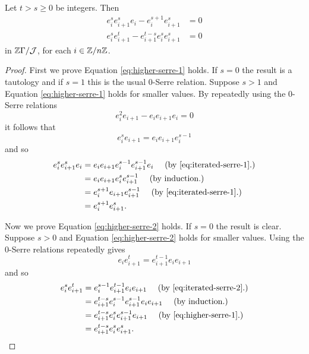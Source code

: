\documentclass[a4paper, 11pt, twoside]{report}
\begin{document}
\begin{lemma}\label{lemma:higher-Serre-relations-plus}
Let $t>s\geq 0$ be integers. Then
\begin{align}
e_i^s e_{i+1}^s e_i - e_i^{s+1}e_{i+1}^s &= 0 \label{eq:higher-serre-1}\\
e_i^s e_{i+1}^t - e_{i+1}^{t-s} e_i^s e_{i+1}^s &= 0 \label{eq:higher-serre-2}
\end{align}
in $\mathbb{Z}\Gamma/{\mathcal{J}}$, for each $i\in\mathbb{Z}/{n \mathbb{Z}}$.
\end{lemma}

\begin{proof}
First we prove Equation \eqref{eq:higher-serre-1} holds. If $s=0$ the result is a tautology and if $s=1$ this is the usual $0$-Serre relation. Suppose $s>1$ and Equation \eqref{eq:higher-serre-1} holds for smaller values. By repeatedly using the $0$-Serre relations
\begin{equation*}
e_i^2e_{i+1} - e_ie_{i+1}e_i = 0
\end{equation*}
it follows that
\begin{equation}
e_i^se_{i+1} = e_i e_{i+1} e_i^{s-1} \label{eq:iterated-serre-1}
\end{equation}
and so
\begin{align*}
e_i^se_{i+1}^se_i
&= e_ie_{i+1}e_i^{s-1}e_{i+1}^{s-1}e_i \quad\text{ (by \eqref{eq:iterated-serre-1}.)}\\
&= e_ie_{i+1}e_i^s e_{i+1}^{s-1} \quad\text{ (by induction.)}\\
&= e_i^{s+1}e_{i+1}e_{i+1}^{s-1} \quad\text{ (by \eqref{eq:iterated-serre-1}.})\\
&= e_i^{s+1}e_{i+1}^s.
\end{align*}

Now we prove Equation \eqref{eq:higher-serre-2} holds. If $s=0$ the result is clear. Suppose $s>0$ and Equation \eqref{eq:higher-serre-2} holds for smaller values. Using the $0$-Serre relations repeatedly gives
\begin{equation}
e_ie_{i+1}^t = e_{i+1}^{t-1}e_ie_{i+1} \label{eq:iterated-serre-2}
\end{equation}
and so
\begin{align*}
e_i^se_{i+1}^t
&= e_i^{s-1}e_{i+1}^{t-1}e_ie_{i+1} \quad\text{ (by \eqref{eq:iterated-serre-2}.)}\\
&= e_{i+1}^{t-s}e_i^{s-1}e_{i+1}^{s-1}e_ie_{i+1} \quad\text{ (by induction.)}\\
&= e_{i+1}^{t-s}e_i^se_{i+1}^{s-1}e_{i+1} \quad\text{ (by \eqref{eq:higher-serre-1}.)}\\
&= e_{i+1}^{t-s} e_i^se_{i+1}^s.
\end{align*}
\end{proof}
\end{document}
